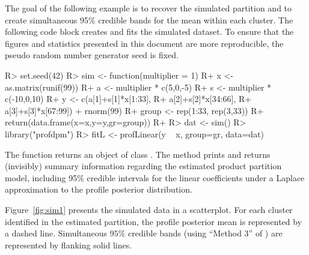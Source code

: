 \documentclass[article, nojss]{jss}
\begin{document}
The goal of the following example is to recover the simulated partition and to create simultaneous 95\% credible bands for the mean within each cluster. The following  code block creates and fits the simulated dataset. To ensure that the figures and statistics presented in this document are more reproducible, the pseudo random number generator seed is fixed. 
\begin{Schunk}
\begin{Sinput}
R> set.seed(42)
R> sim <- function(multiplier = 1) {
R+     x <- as.matrix(runif(99))
R+     a <- multiplier * c(5,0,-5)
R+     s <- multiplier * c(-10,0,10)
R+     y <- c(a[1]+s[1]*x[1:33],
R+            a[2]+s[2]*x[34:66],
R+            a[3]+s[3]*x[67:99]) + rnorm(99)
R+     group <- rep(1:33, rep(3,33))
R+     return(data.frame(x=x,y=y,gr=group))
R+ }
R> dat <- sim()
R> library("profdpm")
R> fitL <- profLinear(y ~ x, group=gr, data=dat)
\end{Sinput}
\end{Schunk}
The  function returns an object of class . The  method prints and returns (invisibly) summary information regarding the estimated product partition model, including 95\% credible intervals for the linear coefficients under a Laplace approximation to the profile posterior distribution.

Figure~\ref{fig:sim1} presents the simulated data in a scatterplot. For each cluster identified in the estimated partition, the profile posterior mean is represented by a dashed line. Simultaneous $95\%$ credible bands (using ``Method 3'' of \citet{HansonMcMillan2012}) are represented by flanking solid lines.
\end{document}
